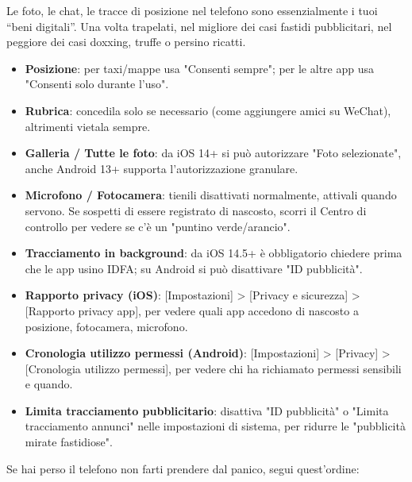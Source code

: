 Le foto, le chat, le tracce di posizione nel telefono sono essenzialmente i tuoi “beni digitali”. Una volta trapelati, nel migliore dei casi fastidi pubblicitari, nel peggiore dei casi doxxing, truffe o persino ricatti.


\begin{itemize}
  \item \textbf{Posizione}: per taxi/mappe usa "Consenti sempre"; per le altre app usa "Consenti solo durante l'uso".
  \item \textbf{Rubrica}: concedila solo se necessario (come aggiungere amici su WeChat), altrimenti vietala sempre.
  \item \textbf{Galleria / Tutte le foto}: da iOS 14+ si può autorizzare "Foto selezionate", anche Android 13+ supporta l'autorizzazione granulare.
  \item \textbf{Microfono / Fotocamera}: tienili disattivati normalmente, attivali quando servono. Se sospetti di essere registrato di nascosto, scorri il Centro di controllo per vedere se c'è un "puntino verde/arancio".
  \item \textbf{Tracciamento in background}: da iOS 14.5+ è obbligatorio chiedere prima che le app usino IDFA; su Android si può disattivare "ID pubblicità".
\end{itemize}


\begin{itemize}
  \item \textbf{Rapporto privacy (iOS)}: [Impostazioni] > [Privacy e sicurezza] > [Rapporto privacy app], per vedere quali app accedono di nascosto a posizione, fotocamera, microfono.
  \item \textbf{Cronologia utilizzo permessi (Android)}: [Impostazioni] > [Privacy] > [Cronologia utilizzo permessi], per vedere chi ha richiamato permessi sensibili e quando.
  \item \textbf{Limita tracciamento pubblicitario}: disattiva "ID pubblicità" o "Limita tracciamento annunci" nelle impostazioni di sistema, per ridurre le "pubblicità mirate fastidiose".
\end{itemize}


Se hai perso il telefono non farti prendere dal panico, segui quest'ordine:

